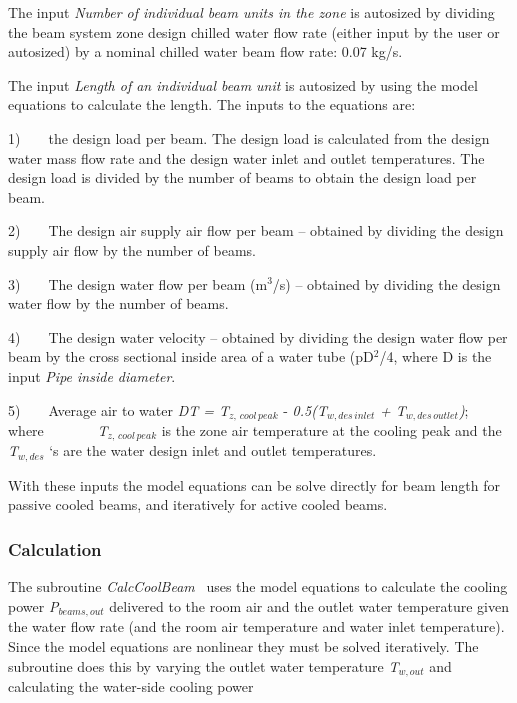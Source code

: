 The input \emph{Number of individual beam units in the zone} is autosized by dividing the beam system zone design chilled water flow rate (either input by the user or autosized) by a nominal chilled water beam flow rate: 0.07 kg/s.

The input \emph{Length of an individual beam unit} is autosized by using the model equations to calculate the length. The inputs to the equations are:

1)~~~~the design load per beam. The design load is calculated from the design water mass flow rate and the design water inlet and outlet temperatures. The design load is divided by the number of beams to obtain the design load per beam.

2)~~~~The design air supply air flow per beam -- obtained by dividing the design supply air flow by the number of beams.

3)~~~~The design water flow per beam (m\(^{3}\)/s) -- obtained by dividing the design water flow by the number of beams.

4)~~~~The design water velocity -- obtained by dividing the design water flow per beam by the cross sectional inside area of a water tube (pD\(^{2}\)/4, where D is the input \emph{Pipe inside diameter}.

5)~~~~Average air to water \emph{DT = T\(_{z,\, cool\, peak}\)} - \emph{0.5(T\(_{w,des\, inlet}\)} \emph{+ T\(_{w,des\, outlet}\))}; where~~~~~~~ \emph{T\(_{z,\, cool\, peak}\)} is the zone air temperature at the cooling peak and the \emph{T\(_{w,des}\)} `s are the water design inlet and outlet temperatures.

With these inputs the model equations can be solve directly for beam length for passive cooled beams, and iteratively for active cooled beams.

\subsubsection{Calculation}\label{calculation-3}

The subroutine \emph{CalcCoolBeam} ~uses the model equations to calculate the cooling power \emph{P\(_{beams,out}\)} delivered to the room air and the outlet water temperature given the water flow rate (and the room air temperature and water inlet temperature). Since the model equations are nonlinear they must be solved iteratively. The subroutine does this by varying the outlet water temperature \emph{T\(_{w,out}\)} and calculating the water-side cooling power

